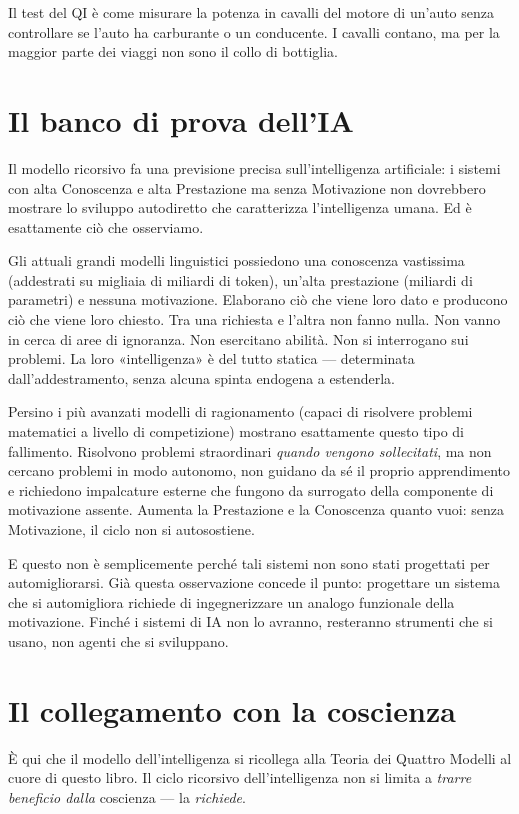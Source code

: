 \documentclass[11pt, twoside, openright]{book}
\begin{document}
Il test del QI è come misurare la potenza in cavalli del motore di un'auto senza controllare se l'auto ha carburante o un conducente. I cavalli contano, ma per la maggior parte dei viaggi non sono il collo di bottiglia.

\section*{Il banco di prova dell'IA}

Il modello ricorsivo fa una previsione precisa sull'intelligenza artificiale: i sistemi con alta Conoscenza e alta Prestazione ma senza Motivazione non dovrebbero mostrare lo sviluppo autodiretto che caratterizza l'intelligenza umana. Ed è esattamente ciò che osserviamo.

Gli attuali grandi modelli linguistici possiedono una conoscenza vastissima (addestrati su migliaia di miliardi di token), un'alta prestazione (miliardi di parametri) e nessuna motivazione. Elaborano ciò che viene loro dato e producono ciò che viene loro chiesto. Tra una richiesta e l'altra non fanno nulla. Non vanno in cerca di aree di ignoranza. Non esercitano abilità. Non si interrogano sui problemi. La loro «intelligenza» è del tutto statica --- determinata dall'addestramento, senza alcuna spinta endogena a estenderla.

Persino i più avanzati modelli di ragionamento (capaci di risolvere problemi matematici a livello di competizione) mostrano esattamente questo tipo di fallimento. Risolvono problemi straordinari \textit{quando vengono sollecitati}, ma non cercano problemi in modo autonomo, non guidano da sé il proprio apprendimento e richiedono impalcature esterne che fungono da surrogato della componente di motivazione assente. Aumenta la Prestazione e la Conoscenza quanto vuoi: senza Motivazione, il ciclo non si autosostiene.

E questo non è semplicemente perché tali sistemi non sono stati progettati per automigliorarsi. Già questa osservazione concede il punto: progettare un sistema che si automigliora richiede di ingegnerizzare un analogo funzionale della motivazione. Finché i sistemi di IA non lo avranno, resteranno strumenti che si usano, non agenti che si sviluppano.

\section*{Il collegamento con la coscienza}

È qui che il modello dell'intelligenza si ricollega alla Teoria dei Quattro Modelli al cuore di questo libro. Il ciclo ricorsivo dell'intelligenza non si limita a \textit{trarre beneficio dalla} coscienza --- la \textit{richiede}.
\end{document}
